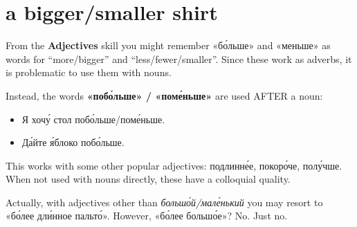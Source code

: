 \section{a bigger/smaller shirt}\label{a-biggersmaller-shirt}

From the \textbf{Adjectives} skill you might remember «б\'{о}льше» and
«меньше» as words for ``more/bigger'' and ``less/fewer/smaller''. Since
these work as adverbs, it is problematic to use them with nouns.

Instead, the words \textbf{«поб\'{о}льше» / «пом\'{е}ньше»} are used AFTER a
noun:

\begin{itemize}
\tightlist
\item
  Я хоч\'{у} стол поб\'{о}льше/пом\'{е}ньше.
\item
  Д\'{а}йте \'{я}блоко поб\'{о}льше.
\end{itemize}

This works with some other popular adjectives: подлинн\'{е}е, покор\'{о}че,
пол\'{у}чше. When not used with nouns directly, these have a colloquial
quality.

Actually, with adjectives other than \emph{больш\'{о}й/мал\'{е}нький} you may
resort to «б\'{о}лее дл\'{и}нное пальт\'{о}». However, «б\'{о}лее больш\'{о}е»? No. Just no.
